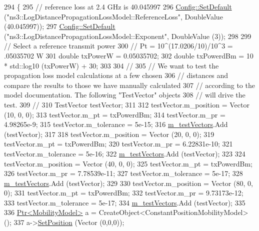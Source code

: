 \begin{DoxyCode}
294 \{
295   \textcolor{comment}{// reference loss at 2.4 GHz is 40.045997}
296   \hyperlink{group__config_ga2e7882df849d8ba4aaad31c934c40c06}{Config::SetDefault} (\textcolor{stringliteral}{"ns3::LogDistancePropagationLossModel::ReferenceLoss"}, DoubleValue 
      (40.045997));
297   \hyperlink{group__config_ga2e7882df849d8ba4aaad31c934c40c06}{Config::SetDefault} (\textcolor{stringliteral}{"ns3::LogDistancePropagationLossModel::Exponent"}, DoubleValue (3));
298 
299   \textcolor{comment}{// Select a reference transmit power}
300   \textcolor{comment}{// Pt = 10^(17.0206/10)/10^3 = .05035702 W}
301   \textcolor{keywordtype}{double} txPowerW = 0.05035702;
302   \textcolor{keywordtype}{double} txPowerdBm = 10 * std::log10 (txPowerW) + 30;
303 
304   \textcolor{comment}{//}
305   \textcolor{comment}{// We want to test the propagation loss model calculations at a few chosen }
306   \textcolor{comment}{// distances and compare the results to those we have manually calculated}
307   \textcolor{comment}{// according to the model documentation.  The following "TestVector" objects}
308   \textcolor{comment}{// will drive the test.}
309   \textcolor{comment}{//}
310   TestVector testVector;
311 
312   testVector.m\_position = Vector (10, 0, 0);
313   testVector.m\_pt = txPowerdBm;
314   testVector.m\_pr = 4.98265e-9;
315   testVector.m\_tolerance = 5e-15; 
316   \hyperlink{classLogDistancePropagationLossModelTestCase_a2e7dbb82f128bd896a9fe5641cf08e8e}{m\_testVectors}.Add (testVector);
317 
318   testVector.m\_position = Vector (20, 0, 0);
319   testVector.m\_pt = txPowerdBm;
320   testVector.m\_pr = 6.22831e-10;
321   testVector.m\_tolerance = 5e-16;
322   \hyperlink{classLogDistancePropagationLossModelTestCase_a2e7dbb82f128bd896a9fe5641cf08e8e}{m\_testVectors}.Add (testVector);
323 
324   testVector.m\_position = Vector (40, 0, 0);
325   testVector.m\_pt = txPowerdBm;
326   testVector.m\_pr = 7.78539e-11;
327   testVector.m\_tolerance = 5e-17;
328   \hyperlink{classLogDistancePropagationLossModelTestCase_a2e7dbb82f128bd896a9fe5641cf08e8e}{m\_testVectors}.Add (testVector);
329 
330   testVector.m\_position = Vector (80, 0, 0);
331   testVector.m\_pt = txPowerdBm;
332   testVector.m\_pr = 9.73173e-12;
333   testVector.m\_tolerance = 5e-17;
334   \hyperlink{classLogDistancePropagationLossModelTestCase_a2e7dbb82f128bd896a9fe5641cf08e8e}{m\_testVectors}.Add (testVector);
335 
336   \hyperlink{classns3_1_1Ptr}{Ptr<MobilityModel>} a = CreateObject<ConstantPositionMobilityModel> (); 
337   a->\hyperlink{classns3_1_1MobilityModel_ac584b3d5a309709d2f13ed6ada1e7640}{SetPosition} (Vector (0,0,0));

\end{DoxyCode}
